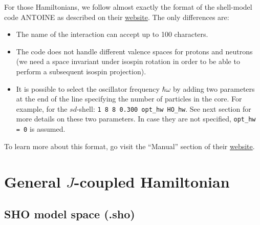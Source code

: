 \documentclass[a4paper,11pt]{article}
\renewcommand{\tt}[1]{\texttt{#1}}
\begin{document}
For those Hamiltonians, we follow almost exactly the format of the shell-model code ANTOINE as described on their
\href{http://www.iphc.cnrs.fr/nutheo/code\_antoine/menu.html}{website}. 
The only differences are:
\begin{itemize}
  \item The name of the interaction can accept up to 100 characters.
  \item The code does not handle different valence spaces for protons and neutrons (we need a space invariant under
  isospin rotation in order to be able to perform a subsequent isospin projection).
  \item It is possible to select the oscillator frequency $\hbar \omega$ by adding two parameters at the end of the line
  specifying the number of particles in the core. 
  For example, for the $sd$-shell: \tt{1 8 8 0.300 opt\_hw HO\_hw}. See next section for more details on these two parameters. 
  In case they are not specified, \tt{opt\_hw = 0} is assumed.
\end{itemize}
To learn more about this format, go visit the ``Manual'' section of their
\href{http://www.iphc.cnrs.fr/nutheo/code\_antoine/menu.html}{website}. 
 

%
%
\section{General $J$-coupled Hamiltonian}

\subsection{SHO model space (.sho)}
\end{document}
